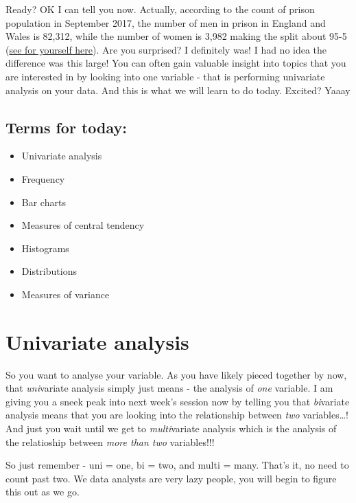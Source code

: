 \documentclass[]{book}
\providecommand{\tightlist}{%
  \setlength{\itemsep}{0pt}\setlength{\parskip}{0pt}}
\theoremstyle{definition}
\theoremstyle{definition}
\theoremstyle{definition}
\theoremstyle{remark}
\begin{document}
Ready? OK I can tell you now. Actually, according to the count of prison
population in September 2017, the number of men in prison in England and
Wales is 82,312, while the number of women is 3,982 making the split
about 95-5
(\href{https://www.gov.uk/government/statistics/prison-population-figures-2017}{see
for yourself here}). Are you surprised? I definitely was! I had no idea
the difference was this large! You can often gain valuable insight into
topics that you are interested in by looking into one variable - that is
performing univariate analysis on your data. And this is what we will
learn to do today. Excited? Yaaay

\hypertarget{terms-for-today}{%
\subsection{Terms for today:}\label{terms-for-today}}

\begin{itemize}
\tightlist
\item
  Univariate analysis
\item
  Frequency
\item
  Bar charts
\item
  Measures of central tendency
\item
  Histograms
\item
  Distributions
\item
  Measures of variance
\end{itemize}

\hypertarget{univariate-analysis}{%
\section{Univariate analysis}\label{univariate-analysis}}

So you want to analyse your variable. As you have likely pieced together
by now, that \emph{uni}variate analysis simply just means - the analysis
of \emph{one} variable. I am giving you a sneek peak into next week's
session now by telling you that \emph{bi}variate analysis means that you
are looking into the relationship between \emph{two} variables\ldots{}!
And just you wait until we get to \emph{multi}variate analysis which is
the analysis of the relatioship between \emph{more than two}
variables!!!

So just remember - uni = one, bi = two, and multi = many. That's it, no
need to count past two. We data analysts are very lazy people, you will
begin to figure this out as we go.
\end{document}
